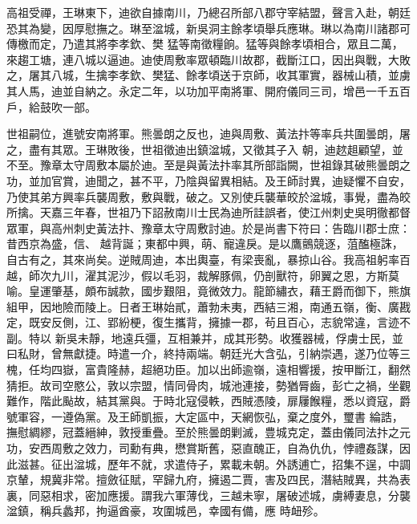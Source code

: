 \begin{pinyinscope}
 高祖受禪，王琳東下，迪欲自據南川，乃總召所部八郡守宰結盟，聲言入赴，朝廷恐其為變，因厚慰撫之。琳至湓城，新吳洞主餘孝頃舉兵應琳。琳以為南川諸郡可傳檄而定，乃遣其將李孝欽、樊
 猛等南徵糧餉。猛等與餘孝頃相合，眾且二萬，來趨工塘，連八城以逼迪。迪使周敷率眾頓臨川故郡，截斷江口，因出與戰，大敗之，屠其八城，生擒李孝欽、樊猛、餘孝頃送于京師，收其軍實，器械山積，並虜其人馬，迪並自納之。永定二年，以功加平南將軍、開府儀同三司，增邑一千五百戶，給鼓吹一部。



 世祖嗣位，進號安南將軍。熊曇朗之反也，迪與周敷、黃法抃等率兵共圍曇朗，屠之，盡有其眾。王琳敗後，世祖徵迪出鎮湓城，又徵其子入
 朝，迪趑趄顧望，並不至。豫章太守周敷本屬於迪。至是與黃法抃率其所部詣闕，世祖錄其破熊曇朗之功，並加官賞，迪聞之，甚不平，乃陰與留異相結。及王師討異，迪疑懼不自安，乃使其弟方興率兵襲周敷，敷與戰，破之。又別使兵襲華皎於湓城，事覺，盡為皎所擒。天嘉三年春，世祖乃下詔赦南川士民為迪所詿誤者，使江州刺史吳明徹都督眾軍，與高州刺史黃法抃、豫章太守周敷討迪。於是尚書下符曰：告臨川郡士庶：昔西京為盛，信、
 越背誕；東都中興，萌、寵違戾。是以鷹鸇競逐，菹醢極誅，自古有之，其來尚矣。逆賊周迪，本出輿臺，有梁喪亂，暴掠山谷。我高祖躬率百越，師次九川，濯其泥沙，假以毛羽，裁解豚佩，仍剖獸符，卵翼之恩，方斯莫喻。皇運肇基，頗布誠款，國步艱阻，竟微效力。龍節繡衣，藉王爵而御下，熊旗組甲，因地險而陵上。日者王琳始貳，蕭勃未夷，西結三湘，南通五嶺，衡、廣戡定，既安反側，江、郢紛梗，復生攜背，擁據一郡，茍且百心，志貌常違，言迹不副。特以
 新吳未靜，地遠兵彊，互相兼并，成其形勢。收獲器械，俘虜士民，並曰私財，曾無獻捷。時遣一介，終持兩端。朝廷光大含弘，引納崇遇，遂乃位等三槐，任均四嶽，富貴隆赫，超絕功臣。加以出師逾嶺，遠相響援，按甲斷江，翻然猜拒。故司空愍公，敦以宗盟，情同骨肉，城池連接，勢猶脣齒，彭亡之禍，坐觀難作，階此颭故，結其黨與。于時北寇侵軼，西賊憑陵，扉屨餱糧，悉以資寇，爵號軍容，一遵偽黨。及王師凱振，大定區中，天網恢弘，棄之度外，璽書
 綸誥，撫慰綢繆，冠蓋縉紳，敦授重疊。至於熊曇朗剿滅，豊城克定，蓋由儀同法抃之元功，安西周敷之效力，司勳有典，懋賞斯舊，惡直醜正，自為仇仇，悖禮姦謀，因此滋甚。征出湓城，歷年不就，求遣侍子，累載未朝。外誘逋亡，招集不逞，中調京輦，規冀非常。擅斂征賦，罕歸九府，擁遏二賈，害及四民，潛結賊異，共為表裏，同惡相求，密加應援。謂我六軍薄伐，三越未寧，屠破述城，虜縛妻息，分襲湓鎮，稱兵蠡邦，拘逼酋豪，攻圍城邑，幸國有備，應
 時衄殄。




\end{pinyinscope}
